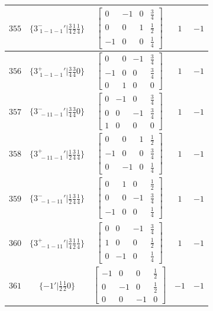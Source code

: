 \documentclass[fleqn,8pt]{jsarticle}
\begin{document}
\begin{longtable}{ccccc}
$ 355 $ & $ \{3^{-}_{\,\,1-1-1}{}'|\frac{3}{4} \frac{1}{2} \frac{1}{4}\} $ & $ \begin{bmatrix} 0 & -1 & 0 & \frac{3}{4} \\ 0 & 0 & 1 & \frac{1}{2} \\ -1 & 0 & 0 & \frac{1}{4} \end{bmatrix} $ & $ 1 $ & $ -1 $ \\ \hline
$ 356 $ & $ \{3^{+}_{\,\,1-1-1}{}'|\frac{3}{4} \frac{3}{4} 0\} $ & $ \begin{bmatrix} 0 & 0 & -1 & \frac{3}{4} \\ -1 & 0 & 0 & \frac{3}{4} \\ 0 & 1 & 0 & 0 \end{bmatrix} $ & $ 1 $ & $ -1 $ \\ \hline
$ 357 $ & $ \{3^{-}_{\,\,-11-1}{}'|\frac{3}{4} \frac{3}{4} 0\} $ & $ \begin{bmatrix} 0 & -1 & 0 & \frac{3}{4} \\ 0 & 0 & -1 & \frac{3}{4} \\ 1 & 0 & 0 & 0 \end{bmatrix} $ & $ 1 $ & $ -1 $ \\ \hline
$ 358 $ & $ \{3^{+}_{\,\,-11-1}{}'|\frac{1}{2} \frac{3}{4} \frac{1}{4}\} $ & $ \begin{bmatrix} 0 & 0 & 1 & \frac{1}{2} \\ -1 & 0 & 0 & \frac{3}{4} \\ 0 & -1 & 0 & \frac{1}{4} \end{bmatrix} $ & $ 1 $ & $ -1 $ \\ \hline
$ 359 $ & $ \{3^{-}_{\,\,-1-11}{}'|\frac{1}{2} \frac{3}{4} \frac{1}{4}\} $ & $ \begin{bmatrix} 0 & 1 & 0 & \frac{1}{2} \\ 0 & 0 & -1 & \frac{3}{4} \\ -1 & 0 & 0 & \frac{1}{4} \end{bmatrix} $ & $ 1 $ & $ -1 $ \\ \hline
$ 360 $ & $ \{3^{+}_{\,\,-1-11}{}'|\frac{3}{4} \frac{1}{2} \frac{1}{4}\} $ & $ \begin{bmatrix} 0 & 0 & -1 & \frac{3}{4} \\ 1 & 0 & 0 & \frac{1}{2} \\ 0 & -1 & 0 & \frac{1}{4} \end{bmatrix} $ & $ 1 $ & $ -1 $ \\ \hline
$ 361 $ & $ \{-1{}'|\frac{1}{2} \frac{1}{2} 0\} $ & $ \begin{bmatrix} -1 & 0 & 0 & \frac{1}{2} \\ 0 & -1 & 0 & \frac{1}{2} \\ 0 & 0 & -1 & 0 \end{bmatrix} $ & $ -1 $ & $ -1 $ \\ \hline

\end{longtable}
\end{document}
